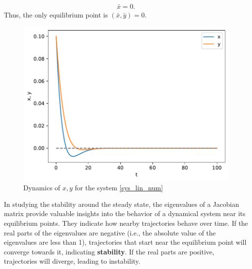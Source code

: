 \documentclass[11pt,a4paper]{book}
\theoremstyle{definition}\newtheorem{definition}{Definition}
\theoremstyle{definition}\newtheorem{fact}{Fact}
\theoremstyle{definition}\newtheorem{remark}{Remark}
\theoremstyle{definition}\newtheorem{ex}{Ex.}
\theoremstyle{definition}\newtheorem{project}{Project}
\theoremstyle{definition}\newtheorem{problem}{Problem}
\theoremstyle{definition}\newtheorem{example}{Example}
\numberwithin{theorem}{section}
\numberwithin{corollary}{chapter}
\numberwithin{assumption}{chapter}
\numberwithin{definition}{chapter}
\numberwithin{prop}{chapter}
\numberwithin{notation}{chapter}
\numberwithin{problem}{chapter}
\numberwithin{example}{chapter}
\numberwithin{fact}{chapter}
\numberwithin{ex}{chapter}
\begin{document}
	\begin{align*}
		\bar{x} = 0.
	\end{align*}
	Thus, the only equilibrium point is $(\bar{x}, \bar{y}) = 0$.
	\begin{figure}[H]
		\centering
		\includegraphics[scale=0.5]{figs/lin_sys.pdf}
		\caption{Dynamics of $x,y$ for the system \eqref{sys_lin_num}}
	\end{figure}
	
	
	 In studying the stability around the steady state, the eigenvalues of a Jacobian matrix provide valuable insights into the behavior of a dynamical system near its equilibrium points. They indicate how nearby trajectories behave over time. If the real parts of the eigenvalues are negative (i.e., the absolute value of the eigenvalues are less than 1), trajectories that start near the equilibrium point will converge towards it, indicating \textbf{stability}. If the real parts are positive, trajectories will diverge, leading to instability. 
	 
\end{document}
